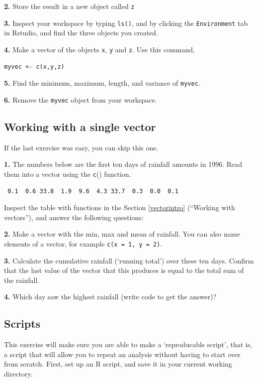 \documentclass[]{book}
\begin{document}
\textbf{2.} Store the result in a new object called \texttt{z}

\textbf{3.} Inspect your workspace by typing \texttt{ls()}, and by clicking the \texttt{Environment} tab in Rstudio, and find the three objects you created.

\textbf{4.} Make a vector of the objects \texttt{x}, \texttt{y} and \texttt{z}. Use this command,

\begin{verbatim}
myvec <- c(x,y,z)
\end{verbatim}

\textbf{5.} Find the minimum, maximum, length, and variance of \texttt{myvec}.

\textbf{6.} Remove the \texttt{myvec} object from your workspace.

\hypertarget{vecexerc1}{%
\subsection{Working with a single vector}\label{vecexerc1}}

If the last exercise was easy, you can skip this one.

\textbf{1.} The numbers below are the first ten days of rainfall amounts in 1996. Read them into a vector using the \texttt{c}() function.

\begin{verbatim}
 0.1  0.6 33.8  1.9  9.6  4.3 33.7  0.3  0.0  0.1
\end{verbatim}

Inspect the table with functions in the Section \ref{vectorintro} (``Working with vectors''), and answer the following questions:

\textbf{2.} Make a vector with the min, max and mean of rainfall. You can also name elements of a vector, for example \texttt{c(x\ =\ 1,\ y\ =\ 2)}.

\textbf{3.} Calculate the cumulative rainfall (`running total') over these ten days. Confirm that the last value of the vector that this produces is equal to the total sum of the rainfall.

\textbf{4.} Which day saw the highest rainfall (write code to get the answer)?

\hypertarget{scriptexercise}{%
\subsection{Scripts}\label{scriptexercise}}

This exercise will make sure you are able to make a `reproducable script', that is, a script that will allow you to repeat an analysis without having to start over from scratch. First, set up an R script, and save it in your current working directory.
\end{document}
